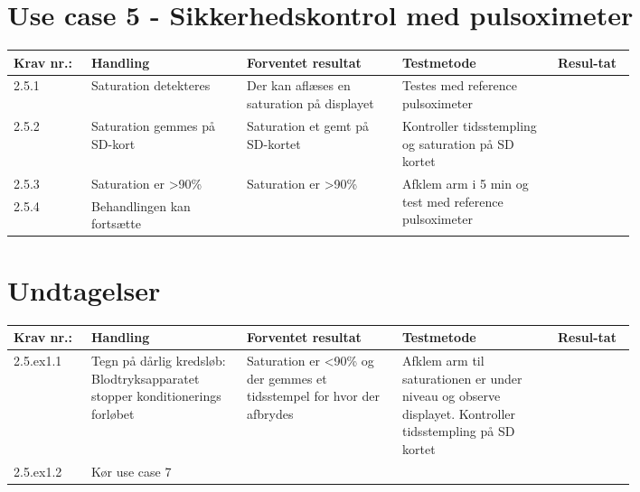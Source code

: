 \section{Use case 5 - Sikkerhedskontrol med pulsoximeter}
					\begin{longtable}{|p{0.1\linewidth}|p{0.2\linewidth}|p{0.2\linewidth}|p{0.2\linewidth}|p{0.1\linewidth}|}
							\hline
							\rowcolor{usDef}
							Krav nr.: & Handling & Forventet resultat & Testmetode & Resul-tat  \\\hline
							2.5.1 & Saturation detekteres & Der kan aflæses en saturation på displayet& Testes med reference pulsoximeter \fxnote{Tilføj reference} & \\ \hline
							2.5.2 & Saturation gemmes på SD-kort & Saturation et gemt på SD-kortet & Kontroller tidsstempling og saturation på SD kortet & \\ \hline
							2.5.3 & Saturation er \textgreater90\%  & \multirow{2}{\linewidth}{Saturation er \textgreater90\% } & \multirow{2}{\linewidth}{Afklem arm i 5 min og test med reference pulsoximeter} & \multirow{2}{\linewidth}{}  \\ \cline{1-2}
							2.5.4 & Behandlingen kan fortsætte & & & \\ \hline
					\end{longtable}
					
					\section*{Undtagelser}
					\begin{longtable}{|p{0.1\linewidth}|p{0.2\linewidth}|p{0.2\linewidth}|p{0.2\linewidth}|p{0.1\linewidth}|}
						\hline
						\rowcolor{usDef}
						Krav nr.: & Handling & Forventet resultat & Testmetode & Resul-tat  \\\hline
						2.5.ex1.1 & Tegn på dårlig kredsløb: Blodtryksapparatet stopper konditionerings forløbet & Saturation er \textless90\% og der gemmes et tidsstempel for hvor der afbrydes & Afklem arm til saturationen er  under niveau og observe displayet.
						Kontroller tidsstempling på SD kortet & \\ \hline
						2.5.ex1.2 & Kør use case 7 & \fxnote{TILFØJ TESTS }& & \\ \hline
						
					\end{longtable}